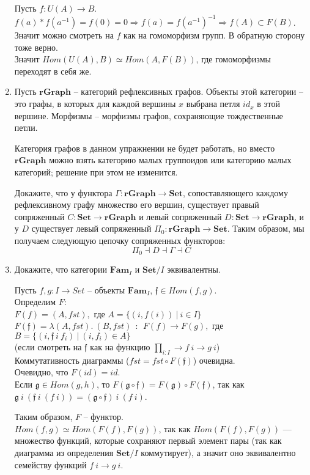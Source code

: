 \documentclass[draft]{article}
\newcommand{\cat}[1]{\mathbf{#1}}
\newcommand{\Set}{\cat{Set}}
\begin{document}
\begin{enumerate}
Пусть $f: U(A) \to B$. $f(a) * f(a^{-1}) = f(0) = 0 \Rightarrow f(a) = f(a^{-1})^{-1} \Rightarrow f(A) \subset F(B)$. Значит можно смотреть на $f$ как на гомоморфизм групп. В обратную сторону тоже верно. \\
Значит $Hom(U(A), B) \simeq Hom(A, F(B))$, где гомоморфизмы переходят в себя же.


\item Пусть $\cat{rGraph}$ -- категорий рефлексивных графов.
Объекты этой категории -- это графы, в которых для каждой вершины $x$ выбрана петля $id_x$ в этой вершине.
Морфизмы -- морфизмы графов, сохраняющие тождественные петли.

Категория графов в данном упражнении не будет работать, но вместо $\cat{rGraph}$ можно взять категорию малых группоидов или категорию малых категорий; решение при этом не изменится.

Докажите, что у функтора $\Gamma : \cat{rGraph} \to \Set$, сопоставляющего каждому рефлексивному графу множество его вершин, существует правый сопряженный $C : \Set \to \cat{rGraph}$ и левый сопряженный $D : \Set \to \cat{rGraph}$,
и у $D$ существует левый сопряженный $\Pi_0 : \cat{rGraph} \to \Set$.
Таким образом, мы получаем следующую цепочку сопряженных функторов:
\[ \Pi_0 \dashv D \dashv \Gamma \dashv C \]

\item Докажите, что категории $\cat{Fam}_I$ и $\Set/I$ эквивалентны.

Пусть $f, g : I \to Set$ -- объекты $\cat{Fam}_I$, $\mathfrak{f} \in Hom(f, g)$.\\
Определим $F$:\\
$F(f) = (A, fst),$ где $A = \{(i, f(i)) ~|~ i \in I\}$\\
$F(\mathfrak{f}) = \lambda (A, fst). ~(B, fst) ~~:~~F(f)\to F(g), $ где\\
 $B = \{(i, \mathfrak{f} ~i~ f_i) ~|~ (i, f_i) \in A \}$\\
(если смотреть на $\mathfrak{f}$ как на функцию $\prod\limits_{i : I} \to f~i \to g~i$)\\
Коммутативность диаграммы ($fst = fst \circ F(\mathfrak{f})$) очевидна.
\\
Очевидно, что $F(id) = id$.  \\
Если $\mathfrak{g}\in Hom(g, h)$, то $F(\mathfrak{g} \circ \mathfrak{f}) = F(\mathfrak{g}) \circ F(\mathfrak{f})$, так как $\mathfrak{g} ~i~ (\mathfrak{f} ~i~ (f~i)) = (\mathfrak{g} \circ \mathfrak{f}) ~i~(f~i)$.

Таким образом, $F$ -- функтор.\\
$Hom(f, g) \simeq Hom(F(f), F(g))$, так как $Hom(F(f), F(g))$ --- множество функций, которые сохраняют первый элемент пары (так как диаграмма из определения $\Set/I$ коммутирует), а значит оно эквивалентно семейству функций 
$f~i \to g~i$.\\


\end{enumerate}
\end{document}
